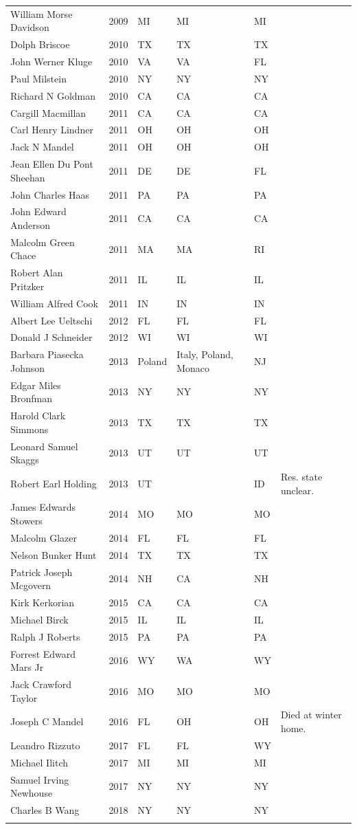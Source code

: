 \documentclass[12pt]{article}
\begin{document}
{\begin{longtable}{l l l l l l}
		William Morse Davidson&2009&MI&MI&MI&\\
		Dolph Briscoe&2010&TX&TX&TX&\\
		John Werner Kluge&2010&VA&VA&FL&\\
		Paul Milstein&2010&NY&NY&NY&\\
		Richard N Goldman&2010&CA&CA&CA&\\
		Cargill Macmillan&2011&CA&CA&CA&\\
		Carl Henry Lindner&2011&OH&OH&OH&\\
		Jack N Mandel&2011&OH&OH&OH&\\
		Jean Ellen Du Pont Sheehan&2011&DE&DE&FL&\\
		John Charles Haas&2011&PA&PA&PA&\\
		John Edward Anderson&2011&CA&CA&CA&\\
		Malcolm Green Chace&2011&MA&MA&RI&\\
		Robert Alan Pritzker&2011&IL&IL&IL&\\
		William Alfred Cook&2011&IN&IN&IN&\\
		Albert Lee Ueltschi&2012&FL&FL&FL&\\
		Donald J Schneider&2012&WI&WI&WI&\\
		Barbara Piasecka Johnson&2013&Poland&Italy, Poland, Monaco&NJ&\\
		Edgar Miles Bronfman&2013&NY&NY&NY&\\
		Harold Clark Simmons&2013&TX&TX&TX&\\
		Leonard Samuel Skaggs&2013&UT&UT&UT&\\
		Robert Earl Holding&2013&UT&&ID&Res. state unclear.\\
		James Edwards Stowers&2014&MO&MO&MO&\\
		Malcolm Glazer&2014&FL&FL&FL&\\
		Nelson Bunker Hunt&2014&TX&TX&TX&\\
		Patrick Joseph Mcgovern&2014&NH&CA&NH&\\
		Kirk Kerkorian&2015&CA&CA&CA&\\
		Michael Birck&2015&IL&IL&IL&\\
		Ralph J Roberts&2015&PA&PA&PA&\\
		Forrest Edward Mars Jr&2016&WY&WA&WY&\\
		Jack Crawford Taylor&2016&MO&MO&MO&\\
		Joseph C Mandel&2016&FL&OH&OH&Died at winter home.\\
		Leandro Rizzuto&2017&FL&FL&WY&\\
		Michael Ilitch&2017&MI&MI&MI&\\
		Samuel Irving Newhouse&2017&NY&NY&NY&\\
		Charles B Wang&2018&NY&NY&NY&\\
		\hline
\label{deaths}
\end{longtable}
}	
\end{document}
